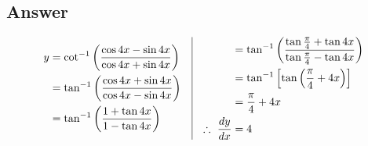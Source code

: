 \documentclass[17pt]{extarticle}
\begin{document}
\begin{fleqn}
\subsection*{Answer}
\begin{equation} \nonumber
\begin{alignedat}{4}
y &=  \cot^{-1}\left(\frac{\cos 4x - \sin 4x}{\cos 4x + \sin 4x}\right)\\
  &= \tan^{-1}\left(\frac{\cos 4x + \sin 4x}{\cos 4x - \sin 4x}\right)\\
  &= \tan^{-1}\left(\frac{1 + \tan 4x}{1 - \tan 4x}\right)\\
\end{alignedat}
\quad
\vrule
\quad 
\begin{alignedat}{4}
&= \tan^{-1}\left(\frac{\tan \frac{\pi}{4} + \tan 4x}{\tan \frac{\pi}{4} - \tan 4x}\right)\\
&=  \tan^{-1}\left[ \tan \left( \frac{\pi}{4}+4x \right)\right]\\
&=  \frac{\pi}{4}+4x\\
\therefore \  \frac{dy}{dx} &= 4\\
\end{alignedat}
\end{equation}

\end{fleqn}
\end{document}
